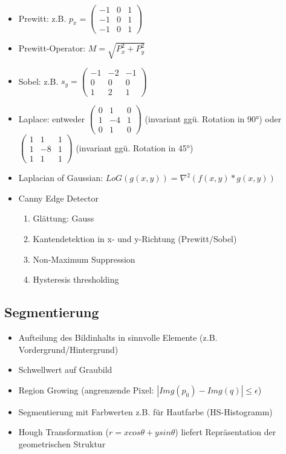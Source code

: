 \documentclass[paper=a4, fontsize=11pt]{scrartcl} %
\numberwithin{equation}{section} %
\numberwithin{figure}{section} %
\numberwithin{table}{section} %
\begin{document}
\begin{itemize}
\item Prewitt: z.B. $p_x = \begin{pmatrix} -1 & 0 & 1\\ -1 & 0 & 1\\ -1 & 0 &1\end{pmatrix}$
\item Prewitt-Operator: $M = \sqrt{P_x^2 + P_y^2}$
\item Sobel: z.B. $s_y = \begin{pmatrix} -1 & -2 & -1\\ 0 & 0 & 0\\ 1 & 2 & 1\end{pmatrix}$
\item Laplace: entweder $\begin{pmatrix} 0 & 1 & 0\\ 1 & -4 & 1\\ 0 & 1 & 0\end{pmatrix}$ (invariant ggü. Rotation in 90°) oder  $\begin{pmatrix} 1 & 1 & 1\\ 1 & -8 & 1\\ 1 & 1 & 1\end{pmatrix}$ (invariant ggü. Rotation in 45°)
\item Laplacian of Gaussian: $LoG(g(x,y)) = \nabla^2(f(x,y) * g(x,y))$
\item Canny Edge Detector
\begin{enumerate}
\item Glättung: Gauss
\item Kantendetektion in x- und y-Richtung (Prewitt/Sobel)
\item Non-Maximum Suppression
\item Hysteresis thresholding
\end{enumerate}
\end{itemize}

\subsection{Segmentierung}

\begin{itemize}
\item Aufteilung des Bildinhalts in sinnvolle Elemente (z.B. Vordergrund/Hintergrund)
\item Schwellwert auf Graubild
\item Region Growing (angrenzende Pixel: $|Img(p_0) - Img(q)| \le \epsilon$)
\item Segmentierung mit Farbwerten z.B. für Hautfarbe (HS-Histogramm)
\item Hough Transformation ($r = x cos \theta + y sin \theta$) liefert Repräsentation der geometrischen Struktur
\end{itemize}
\end{document}
